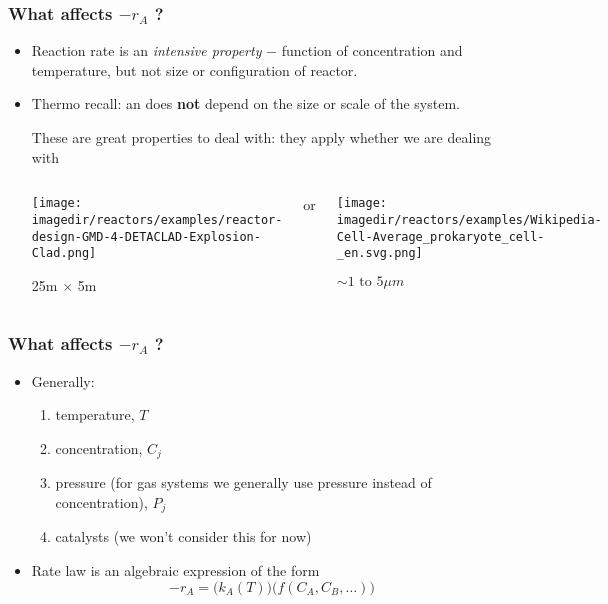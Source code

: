 \begin{frame}[label=intensive-property]\frametitle{What affects $-r_A$ ?}
	\begin{itemize}
		\item	 {Reaction rate is an \emph{\color{purple}intensive property} $-$ function of concentration and temperature, but not size or configuration of reactor.}
		\item	Thermo recall: an {\color{purple}{intensive property}} does \textbf{not} depend on the size or scale of the system.

				These are great properties to deal with: they apply whether we are dealing with

			\begin{columns}[c]
					\begin{center}
						\texttt{[image: \\imagedir/reactors/examples/reactor-design-GMD-4-DETACLAD-Explosion-Clad.png]}

						25m $\times$ 5m
					\end{center}
					or
					\begin{center}
						\texttt{[image: \\imagedir/reactors/examples/Wikipedia-Cell-Average\_prokaryote\_cell-\_en.svg.png]}

						$\sim 1\text{ to }5\mu m$
					\end{center}
			\end{columns}
	\end{itemize}
\end{frame}

\begin{frame}\frametitle{What affects $-r_A$ ?}
	\begin{itemize}
		\item	Generally:
		\begin{enumerate}
			\item	temperature, $T$
			\item	concentration, $C_j$
			\item	pressure (for gas systems we generally use pressure instead of concentration), $P_j$
			\item	catalysts (we won't consider this for now)
		\end{enumerate}
		\item	Rate law is an algebraic expression of the form
				\[
					-r_A = \Biggl(k_A(T)\Biggr)\Biggl(f(C_A, C_B, \ldots)\Biggr)
				\]
	\end{itemize}
\end{frame}

